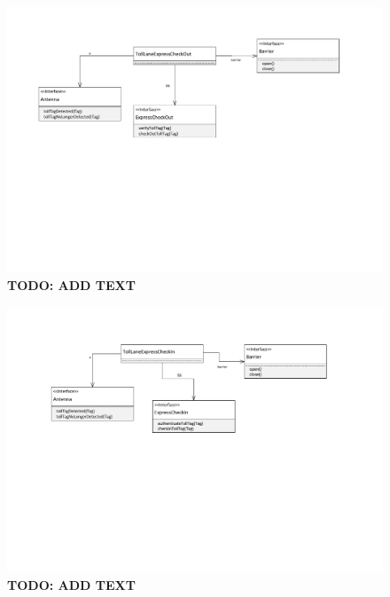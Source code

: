 \begin{figure}
\centerline{\includegraphics[width=\textwidth]{img/class_diagrams/class_diagram_toll_lane_express_check_in}}
\caption{\textbf{TODO: ADD TEXT}}
\label{fig:cld_tlei}
\end{figure}

\begin{figure}
\centerline{\includegraphics[width=\textwidth]{img/class_diagrams/class_diagram_toll_lane_express_check_out}}
\caption{\textbf{TODO: ADD TEXT}}
\label{fig:cld_tleo}
\end{figure}

